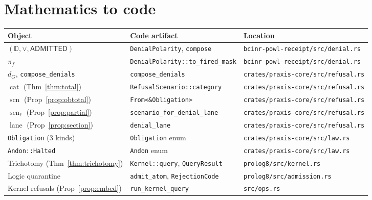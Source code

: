 \documentclass[11pt,oneside]{book}
\theoremstyle{definition}
\theoremstyle{plain}
\theoremstyle{remark}
\newcommand{\code}[1]{\texttt{#1}}
\newcommand{\Deny}{\mathbb{D}}                 %
\newcommand{\Adml}{\mathsf{ADMITTED}}          %
\newcommand{\firedmap}{\pi_{f}}                %
\DeclareMathOperator{\catop}{cat}
\DeclareMathOperator{\laneop}{lane}
\DeclareMathOperator{\scnop}{scn}
\begin{document}
\section*{Mathematics to code}
\begin{center}
\begin{tabular}{lll}
\toprule
Object & Code artifact & Location\\
\midrule
$(\Deny,\lor,\Adml)$ & \code{DenialPolarity}, \code{compose} & \code{bcinr-powl-receipt/src/denial.rs}\\
$\firedmap$ & \code{DenialPolarity::to\_fired\_mask} & \code{bcinr-powl-receipt/src/denial.rs}\\
$d_G$, \code{compose\_denials} & \code{compose\_denials} & \code{crates/praxis-core/src/refusal.rs}\\
$\catop$ (Thm~\ref{thm:total}) & \code{RefusalScenario::category} & \code{crates/praxis-core/src/refusal.rs}\\
$\scnop$ (Prop~\ref{prop:obtotal}) & \code{From<\&Obligation>} & \code{crates/praxis-core/src/refusal.rs}\\
$\scnop_\ell$ (Prop~\ref{prop:partial}) & \code{scenario\_for\_denial\_lane} & \code{crates/praxis-core/src/refusal.rs}\\
$\laneop$ (Prop~\ref{prop:section}) & \code{denial\_lane} & \code{crates/praxis-core/src/refusal.rs}\\
\code{Obligation} (3 kinds) & \code{Obligation} enum & \code{crates/praxis-core/src/law.rs}\\
\code{Andon::Halted} & \code{Andon} enum & \code{crates/praxis-core/src/law.rs}\\
Trichotomy (Thm~\ref{thm:trichotomy}) & \code{Kernel::query}, \code{QueryResult} & \code{prolog8/src/kernel.rs}\\
Logic quarantine & \code{admit\_atom}, \code{RejectionCode} & \code{prolog8/src/admission.rs}\\
Kernel refusals (Prop~\ref{prop:embed}) & \code{run\_kernel\_query} & \code{src/ops.rs}\\
\bottomrule
\end{tabular}
\end{center}
\end{document}
